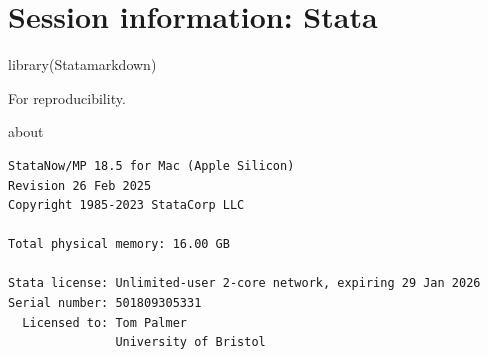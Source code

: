 \documentclass[
  10pt,
  a4paper,
]{book}
\newenvironment{Shaded}{\begin{snugshade}}{\end{snugshade}}
\newcommand{\FunctionTok}[1]{\textcolor[rgb]{0.28,0.35,0.67}{#1}}
\newcommand{\NormalTok}[1]{\textcolor[rgb]{0.00,0.46,0.62}{#1}}
\begin{document}
\chapter*{Session information: Stata}\label{session-information-stata}

\begin{Shaded}
\begin{Highlighting}[]
\FunctionTok{library}\NormalTok{(Statamarkdown)}
\end{Highlighting}
\end{Shaded}

For reproducibility.

\begin{Shaded}
\begin{Highlighting}[]
\NormalTok{about}
\end{Highlighting}
\end{Shaded}

\begin{verbatim}
StataNow/MP 18.5 for Mac (Apple Silicon)
Revision 26 Feb 2025
Copyright 1985-2023 StataCorp LLC

Total physical memory: 16.00 GB

Stata license: Unlimited-user 2-core network, expiring 29 Jan 2026
Serial number: 501809305331
  Licensed to: Tom Palmer
               University of Bristol
\end{verbatim}
\end{document}

